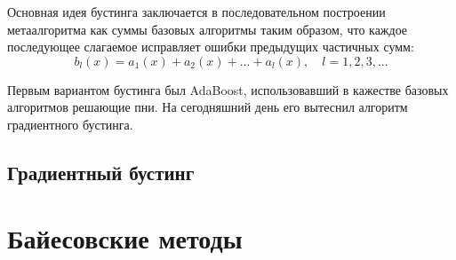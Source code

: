 Основная идея бустинга заключается в последовательном построении метаалгоритма как суммы базовых алгоритмы таким образом, что каждое последующее слагаемое исправляет ошибки предыдущих частичных сумм:
$$
b_l(x) = a_1(x) + a_2(x) + ... + a_l(x), \quad l = 1,2,3,...
$$

Первым вариантом бустинга был AdaBoost, использовавший в кажестве базовых алгоритмов решающие пни. На сегодняшний день его вытеснил алгоритм градиентного бустинга.

\subsection{Градиентный бустинг}


\section{Байесовские методы}



